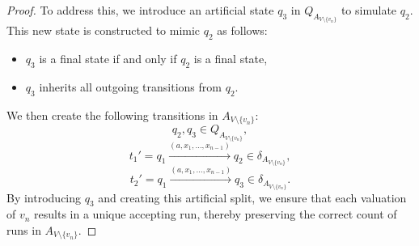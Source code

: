 \documentclass[12pt]{article}
\theoremstyle{definition}
\newtheorem{lemma}[theorem]{Lemma}
\begin{document}
\begin{proof}
    To address this, we introduce an artificial state $q_3$ in $Q_{A_{V \setminus \{v_n\}}}$ to simulate $q_2$. This new state is constructed to mimic $q_2$ as follows:
    \begin{itemize}
        \item $q_3$ is a final state if and only if $q_2$ is a final state,
        \item $q_3$ inherits all outgoing transitions from $q_2$.
    \end{itemize}
    We then create the following transitions in $A_{V \setminus \{v_n\}}$:
    $$q_2, q_3 \in Q_{A_{V \setminus \{v_n\}}},$$
    $$t_1' = q_1 \xrightarrow{(a, x_1, \ldots, x_{n-1})} q_2 \in \delta_{A_{V \setminus \{v_n\}}},$$
    $$t_2' = q_1 \xrightarrow{(a, x_1, \ldots, x_{n-1})} q_3 \in \delta_{A_{V \setminus \{v_n\}}}.$$
    By introducing $q_3$  and creating this artificial split, we ensure that each valuation of $v_n$ results in a unique accepting run, thereby preserving the correct count of runs in $A_{V \setminus \{v_n\}}$.
\end{proof}

\end{document}
